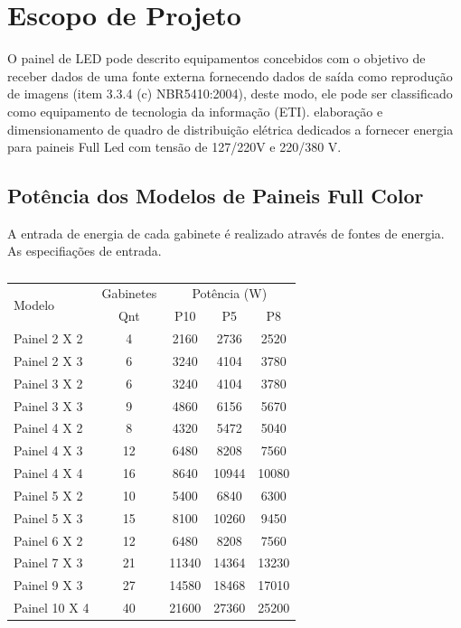 \chapter{Escopo de Projeto}


O painel de LED pode descrito equipamentos concebidos com o objetivo de receber dados de uma fonte externa fornecendo dados de saída como reprodução de imagens (item 3.3.4 (c) NBR5410:2004), deste modo, ele pode ser classificado como equipamento de tecnologia da informação (ETI).
elaboração e dimensionamento de quadro de distribuição elétrica dedicados a fornecer energia para paineis Full Led com tensão de 127/220V e 220/380 V.


 
\section{Potência dos Modelos de Paineis Full Color}
A entrada de energia de cada gabinete é realizado através de fontes de energia. As especifiações de entrada.
\begin{table}[htbp]
\caption{}
\centering
\begin{tabular}{ l c c c c}
\toprule
\multirow{2}{*}{Modelo}& Gabinetes       & 	 		 \multicolumn{3}{c}{Potência (W)} 			 \\ 
\cmidrule{3-5}
                       & Qnt   & \multicolumn{1}{c}{P10} & \multicolumn{1}{c}{P5} & \multicolumn{1}{c}{P8} \\ 
\midrule

Painel 2 X 2           & 4      & 2160 			    & 2736 			& 2520 \\ 
Painel 2 X 3           & 6      & 3240 				& 4104 			& 3780 \\ 
Painel 3 X 2           & 6      & 3240 				& 4104 			& 3780 \\ 
Painel 3 X 3           & 9      & 4860 				& 6156 			& 5670 \\ 
Painel 4 X 2           & 8      & 4320 				& 5472 			& 5040 \\ 
Painel 4 X 3           & 12     & 6480 				& 8208 			& 7560 \\ 
Painel 4 X 4           & 16     & 8640 				& 10944 		& 10080 \\
Painel 5 X 2		 & 10 		& 5400 				& 6840 			& 6300 \\ 
Painel 5 X 3 			& 15 	& 8100 				& 10260 		& 9450 \\
Painel 6 X 2 			& 12 	& 6480 				& 8208 			& 7560 \\ 
Painel 7 X 3 			& 21 	& 11340 			& 14364 		& 13230 \\ 
Painel 9 X 3 			& 27 	& 14580 			& 18468 		& 17010 \\ 
Painel 10 X 4 			& 40 	& 21600 			& 27360 		& 25200 \\
\bottomrule
\end{tabular}
\label{tab:pot_Painel}
\end{table}

